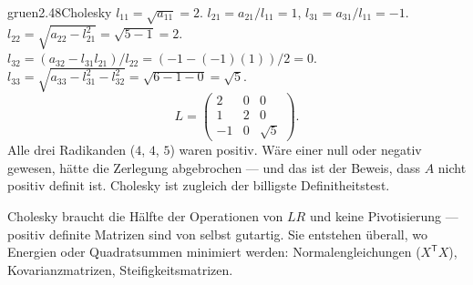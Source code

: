 \begin{loesungkarte}{gruen}{2.48}{Cholesky}
$l_{11} = \sqrt{a_{11}} = 2$. $l_{21} = a_{21}/l_{11} = 1$, $l_{31} = a_{31}/l_{11} = -1$.
$l_{22} = \sqrt{a_{22} - l_{21}^{2}} = \sqrt{5 - 1} = 2$. $l_{32} = (a_{32} - l_{31}l_{21})/l_{22} = (-1 - (-1)(1))/2 = 0$.
$l_{33} = \sqrt{a_{33} - l_{31}^{2} - l_{32}^{2}} = \sqrt{6 - 1 - 0} = \sqrt5$.
\[ L = \begin{pmatrix}2 & 0 & 0\\ 1 & 2 & 0\\ -1 & 0 & \sqrt5\end{pmatrix}. \]
Alle drei Radikanden ($4$, $4$, $5$) waren positiv. Wäre einer null oder negativ gewesen, hätte die Zerlegung abgebrochen --- und das ist der Beweis, dass $A$ nicht positiv definit ist. Cholesky ist zugleich der billigste Definitheitstest.
\begin{mitnehmen}\kastentext
Cholesky braucht die Hälfte der Operationen von $LR$ und keine Pivotisierung --- positiv definite Matrizen sind von selbst gutartig. Sie entstehen überall, wo Energien oder Quadratsummen minimiert werden: Normalengleichungen ($X^{\mathsf T}X$), Kovarianzmatrizen, Steifigkeitsmatrizen.
\end{mitnehmen}
\end{loesungkarte}
